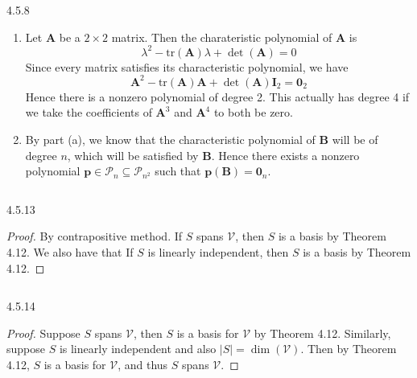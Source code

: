 \documentclass{article}
\theoremstyle{definition}
\begin{document}
	\begin{prob}{4.5.8} $  $
		\begin{enumerate}[label=\alph*.)]
			\item Let $ \mathbf{A} $ be a $ 2\times 2 $ matrix. Then the charateristic polynomial of $ \mathbf{A} $ is $$ \lambda^2 - \text{tr}(\mathbf{A})\lambda + \det(\mathbf{A}) = 0 $$ Since every matrix satisfies its characteristic polynomial, we have $$ \mathbf{A}^2 - \text{tr}(\mathbf{A})\mathbf{A} + \det(\mathbf{A})\mathbf{I}_2 = \mathbf{0}_2 $$ Hence there is a nonzero polynomial of degree 2. This actually has degree 4 if we take the coefficients of $ \mathbf{A}^3 $ and $ \mathbf{A}^4 $ to both be zero.
			
			\item By part (a), we know that the characteristic polynomial of $ \mathbf{B} $ will be of degree $ n $, which will be satisfied by $ \mathbf{B} $. Hence there exists a nonzero polynomial $\mathbf{p} \in \mathcal{P}_n \subseteq \mathcal{P}_{n^2} $ such that $ \mathbf{p}(\mathbf{B}) = \mathbf{0}_n $.
		\end{enumerate}
		$  $ 
	\end{prob}

	\begin{prob}{4.5.13} $  $
		\begin{proof}
			By contrapositive method. If $ S $ spans $ \mathcal{V} $, then $ S $ is a basis by Theorem 4.12. We also have that  If $ S $ is linearly independent, then $ S $ is a basis by Theorem 4.12.
		\end{proof}
		$  $
	\end{prob}

	
	
	\begin{prob}{4.5.14} $  $
		\begin{proof}
			Suppose $ S $ spans $ \mathcal{V} $, then $ S $ is a basis for $ \mathcal{V} $ by Theorem 4.12. Similarly, suppose $ S $ is linearly independent and also $ |S| = \dim(\mathcal{V}) $. Then by Theorem 4.12, $ S $ is a basis for $ \mathcal{V} $, and thus $ S $ spans $ \mathcal{V} $.
		\end{proof}
		$  $
	\end{prob}
    
\end{document}
